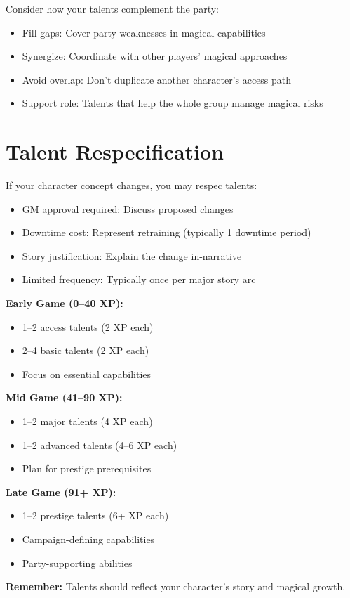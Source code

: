 \documentclass[11pt,twoside,openany]{book}
\begin{document}
Consider how your talents complement the party:
\begin{itemize}
\item Fill gaps: Cover party weaknesses in magical capabilities
\item Synergize: Coordinate with other players' magical approaches
\item Avoid overlap: Don't duplicate another character's access path
\item Support role: Talents that help the whole group manage magical risks
\end{itemize}

\section*{Talent Respecification} 

If your character concept changes, you may respec talents:
\begin{itemize}
\item GM approval required: Discuss proposed changes
\item Downtime cost: Represent retraining (typically 1 downtime period)
\item Story justification: Explain the change in-narrative
\item Limited frequency: Typically once per major story arc
\end{itemize}

\begin{tcolorbox}[colback=gray!5!white, colframe=gray!75!black, title=Talent Selection Guide, fonttitle=\bfseries]
\textbf{Early Game (0–40 XP):}
\begin{itemize}
\item 1–2 access talents (2 XP each)
\item 2–4 basic talents (2 XP each)
\item Focus on essential capabilities
\end{itemize}

\textbf{Mid Game (41–90 XP):}
\begin{itemize}
\item 1–2 major talents (4 XP each)
\item 1–2 advanced talents (4–6 XP each)
\item Plan for prestige prerequisites
\end{itemize}

\textbf{Late Game (91+ XP):}
\begin{itemize}
\item 1–2 prestige talents (6+ XP each)
\item Campaign-defining capabilities
\item Party-supporting abilities
\end{itemize}

\textbf{Remember:} Talents should reflect your character's story and magical growth.
\end{tcolorbox}
\end{document}

